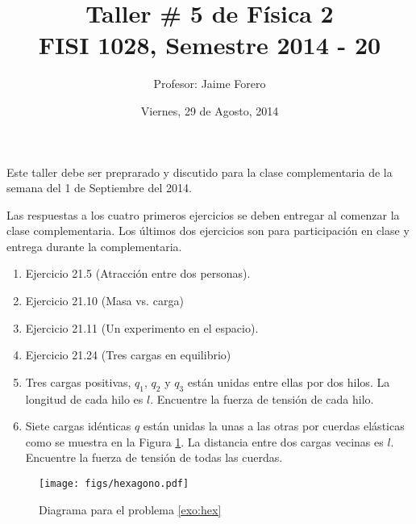\documentclass{article}
\title{Taller \# 5 de F\'isica 2\\ FISI 1028, Semestre 2014 - 20}
\author{Profesor: Jaime Forero}
\date{Viernes, 29 de Agosto, 2014}
\begin{document}
\maketitle
\thispagestyle{empty}

\noindent
Este taller debe ser preprarado y discutido para la clase
complementaria de la semana del 1 de Septiembre del 2014.

Las respuestas a los cuatro primeros ejercicios se deben entregar al comenzar la
clase complementaria. Los \'ultimos dos ejercicios son para participaci\'on en clase y entrega durante la complementaria. 

\begin{enumerate}

\item
Ejercicio 21.5 (Atracci\'on entre dos personas).

\item
Ejercicio 21.10 (Masa vs. carga)

\item
Ejercicio 21.11 (Un experimento en el espacio).

\item
Ejercicio 21.24 (Tres cargas en equilibrio)


\item
Tres cargas positivas, $q_1$, $q_2$ y $q_3$ est\'an unidas entre ellas
por dos hilos. La longitud de cada hilo es $l$. Encuentre la fuerza de
tensi\'on de cada hilo.

\item
\label{exo:hex}
Siete cargas id\'enticas $q$ est\'an unidas la unas a las otras por
cuerdas el\'asticas como se muestra en la Figura \ref{fig:hex}. La
distancia entre dos cargas vecinas es $l$. Encuentre la fuerza de
tensión de todas las cuerdas. 
\end{enumerate}


\begin{figure}[h!]
\begin{center}
\texttt{[image: figs/hexagono.pdf]}
\end{center}
\caption{Diagrama para el problema \ref{exo:hex}}
\label{fig:hex}
\end{figure}
\end{document}
